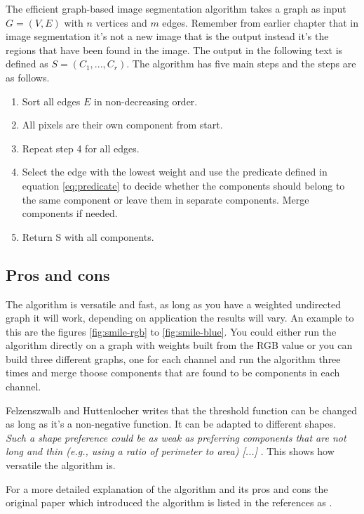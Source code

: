 The efficient graph-based image segmentation algorithm takes a graph as input
\(G = (V,E)\) with \(n\) vertices and \(m\) edges. Remember from earlier chapter
that in image segmentation it's not a new image that is the output instead it's
the regions that have been found in the image. The output in the following text
is defined as \(S = (C_1,...,C_r)\). The algorithm has five main steps and the
steps are as follows.
\begin{enumerate}
    \item Sort all edges \(E\) in non-decreasing order.
    \item All pixels are their own component from start.
    \item Repeat step 4 for all edges.
    \item Select the edge with the lowest weight and use the predicate defined in
        equation \ref{eq:predicate} to decide whether the components should belong
        to the same component or leave them in separate components. Merge components
        if needed.
    \item Return S with all components.
\end{enumerate}
\subsection{Pros and cons}
The algorithm is versatile and fast, as long as you have a weighted undirected graph
it will work, depending on application the results will vary. An example to this
are the figures \ref{fig:smile-rgb} to \ref{fig:smile-blue}. You could either
run the algorithm directly on a graph with weights built from the RGB value or
you can build three different graphs, one for each channel and run the
algorithm three times and merge thoose components that are found to be
components in each channel. 

Felzenszwalb and Huttenlocher \cite{felzenszwalb2004} writes that the threshold
function can be changed as long as it's a non-negative function. It can be
adapted to different shapes. {\em Such a shape preference could be as weak as
    preferring components that are not long and thin (e.g., using a ratio
of perimeter to area) [...]} \cite{felzenszwalb2004}. This shows how versatile
the algorithm is.

For a more detailed explanation of the algorithm and its pros and cons the
original paper which introduced the algorithm is listed in the references as \cite{felzenszwalb2004}.


